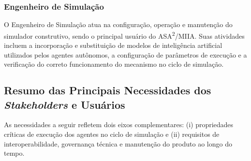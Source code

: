 \subsubsection{Engenheiro de Simulação}

O Engenheiro de Simulação atua na configuração, operação e manutenção do simulador construtivo, sendo o principal usuário do ASA\textsuperscript{2}/MIIA. Suas atividades incluem a incorporação e substituição de modelos de inteligência artificial utilizados pelos agentes autônomos, a configuração de parâmetros de execução e a verificação do correto funcionamento do mecanismo no ciclo de simulação.

\subsection{Resumo das Principais Necessidades dos \emph{Stakeholders} e Usuários}

As necessidades a seguir refletem dois eixos complementares: (i) propriedades críticas de execução dos agentes no ciclo de simulação e (ii) requisitos de interoperabilidade, governança técnica e manutenção do produto ao longo do tempo.


